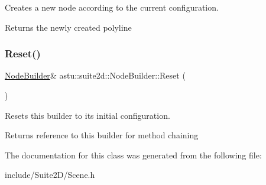 Creates a new node according to the current configuration.

\begin{DoxyReturn}{Returns}
the newly created polyline 
\end{DoxyReturn}
\mbox{\label{classastu_1_1suite2d_1_1NodeBuilder_aa4cc219e5a695416b00b860bb56f5133}} 
\subsubsection{\texorpdfstring{Reset()}{Reset()}}
{\footnotesize\ttfamily \hyperlink{classastu_1_1suite2d_1_1NodeBuilder}{Node\+Builder}\& astu\+::suite2d\+::\+Node\+Builder\+::\+Reset (\begin{DoxyParamCaption}{ }\end{DoxyParamCaption})\hspace{0.3cm}{\ttfamily [inline]}}

Resets this builder to its initial configuration.

\begin{DoxyReturn}{Returns}
reference to this builder for method chaining 
\end{DoxyReturn}


The documentation for this class was generated from the following file\+:\begin{DoxyCompactItemize}
\item 
include/\+Suite2\+D/Scene.\+h\end{DoxyCompactItemize}
